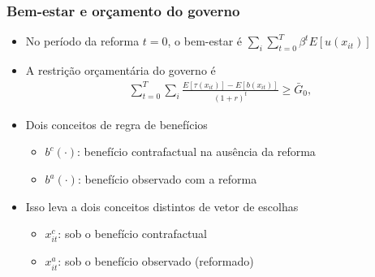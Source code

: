 \begin{frame}
\frametitle{Bem-estar e orçamento do governo}
\begin{itemize}
    \item No período da reforma $t=0$, o bem-estar é $\sum_{i} \sum_{t=0}^T\beta^t E[ u(x_{it})]$
    \item A restrição orçamentária do governo é
    \begin{align*}
        \sum_{t=0}^T \sum_i \frac{E[\tau(x_{it})]-E[b(x_{it})]}{(1+r)^t}\geq\bar G_0,
    \end{align*}
    \item Dois conceitos de regra de benefícios
    \begin{itemize}
        \item $b^c(\cdot)$: benefício contrafactual na ausência da reforma
        \item $b^a(\cdot)$: benefício observado com a reforma
    \end{itemize}
    \item Isso leva a dois conceitos distintos de vetor de escolhas
    \begin{itemize}
        \item $x^c_{it}$: sob o benefício contrafactual
        \item $x_{it}^a$: sob o benefício observado (reformado)
    \end{itemize}
\end{itemize}
\end{frame}

